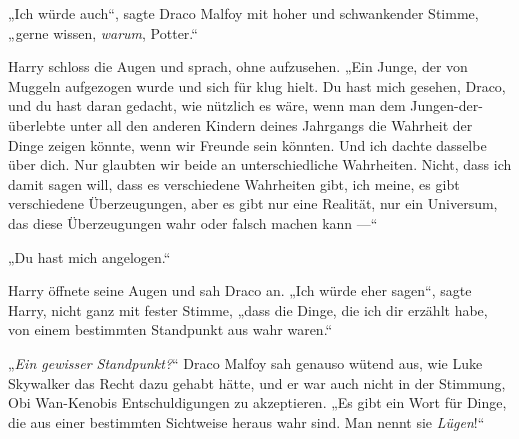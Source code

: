 „Ich würde auch“, sagte Draco Malfoy mit hoher und schwankender Stimme, „gerne wissen, \emph{warum}, Potter.“

Harry schloss die Augen und sprach, ohne aufzusehen.
„Ein Junge, der von Muggeln aufgezogen wurde und sich für klug hielt. Du hast mich gesehen, Draco, und du hast daran gedacht, wie nützlich es wäre, wenn man dem Jungen-der-überlebte unter all den anderen Kindern deines Jahrgangs die Wahrheit der Dinge zeigen könnte, wenn wir Freunde sein könnten. Und ich dachte dasselbe über dich. Nur glaubten wir beide an unterschiedliche Wahrheiten. Nicht, dass ich damit sagen will, dass es verschiedene Wahrheiten gibt, ich meine, es gibt verschiedene Überzeugungen, aber es gibt nur eine Realität, nur ein Universum, das diese Überzeugungen wahr oder falsch machen kann —“

„Du hast mich angelogen.“

Harry öffnete seine Augen und sah Draco an.
„Ich würde eher sagen“, sagte Harry, nicht ganz mit fester Stimme, „dass die Dinge, die ich dir erzählt habe, von einem bestimmten Standpunkt aus wahr waren.“

„\emph{Ein gewisser Standpunkt?}“
Draco Malfoy sah genauso wütend aus, wie Luke Skywalker das Recht dazu gehabt hätte, und er war auch nicht in der Stimmung, Obi Wan-Kenobis Entschuldigungen zu akzeptieren.
„Es gibt ein Wort für Dinge, die aus einer bestimmten Sichtweise heraus wahr sind. Man nennt sie \emph{Lügen}!“

